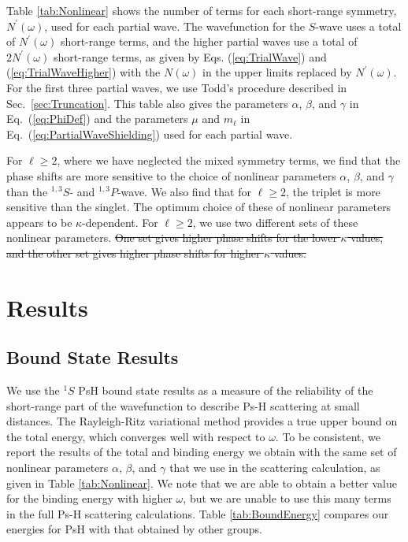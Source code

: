 \documentclass[preprint,showpacs,showkeys,preprintnumbers,amsmath,amssymb,longbibliography,pra,aps]{revtex4-1}
\begin{document}
{Table \ref{tab:Nonlinear} shows
the number of terms for each short-range 
symmetry, $N^\prime(\omega)$, used for each partial wave. The wavefunction
for the $S$-wave uses a 
total of $N^\prime(\omega)$ short-range terms, and the higher partial waves 
use a total of $2 N^\prime(\omega)$ short-range terms, as given by Eqs.
(\ref{eq:TrialWave}) and (\ref{eq:TrialWaveHigher}) with the 
$N(\omega)$ in the upper limits replaced by $N^\prime(\omega)$.
For the first three partial waves,
we use Todd's procedure described in Sec.~\ref{sec:Truncation}.
This table also gives the parameters $\alpha$, $\beta$, and
$\gamma$ in Eq.~(\ref{eq:PhiDef}) and the parameters $\mu$ and $m_\ell$ in 
Eq.~(\ref{eq:PartialWaveShielding}) used for each partial wave.

For $\ell \geq 2$, where we have neglected the mixed symmetry terms,
we find that the phase shifts are more sensitive to the
choice of nonlinear parameters $\alpha$, $\beta$, and $\gamma$
than the $^{1,3}S$- and $^{1,3}P$-wave. We also find that for $\ell \geq 2$,
the triplet is more sensitive than the singlet. The optimum choice of these
of nonlinear parameters appears to be $\kappa$-dependent. For $\ell \geq 2$, we
use two different sets of these nonlinear parameters. \sout{One set gives higher
phase shifts for the lower $\kappa$ values, and the other set gives
higher phase shifts for higher $\kappa$ values.}


\section{Results}
\label{sec:Results}

\subsection{Bound State Results}

We use the $^1S$ PsH bound state results as a measure of the reliability of the 
short-range part of the wavefunction to describe Ps-H scattering at small 
distances. The Rayleigh-Ritz variational method provides a true upper
bound on the 
total energy, which converges well with respect to $\omega$. To 
be consistent, we report the results of the total and binding energy
we obtain with the same set of nonlinear 
parameters $\alpha$, $\beta$, and $\gamma$ that we use in the scattering calculation, as given in
Table \ref{tab:Nonlinear}.
We note that we are able to obtain a better value for
the binding energy with higher $\omega$, but we are unable to use this many
terms in the full Ps-H scattering calculations. Table \ref{tab:BoundEnergy} 
compares our energies for PsH with that obtained by other groups.

}
\end{document}
